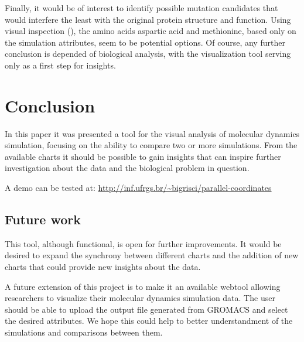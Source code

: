 \documentclass[10pt, conference]{IEEEtran}
\begin{document}
Finally, it would be of interest to identify possible mutation candidates that would interfere the least with the original protein structure and function. Using visual inspection (), the amino acids aspartic acid and methionine, based only on the simulation attributes, seem to be potential options. Of course, any further conclusion is depended of biological analysis, with the visualization tool serving only as a first step for insights. 



\section{Conclusion}
%

In this paper it was presented a tool for the visual analysis of molecular dynamics simulation, focusing on the ability to compare two or more simulations. From the available charts it should be possible to gain insights that can inspire further investigation about the data and the biological problem in question. 

A demo can be tested at: \url{http://inf.ufrgs.br/~bigrisci/parallel-coordinates}

\subsection{Future work}
%
This tool, although functional, is open for further improvements. It would be desired to expand the synchrony between different charts and the addition of new charts that could provide new insights about the data.

A future extension of this project is to make it an available webtool allowing researchers to visualize their molecular dynamics simulation data. The user should be able to upload the output file generated from GROMACS and select the desired attributes. We hope this could help to better understandment of the simulations and comparisons between them.
\end{document}
